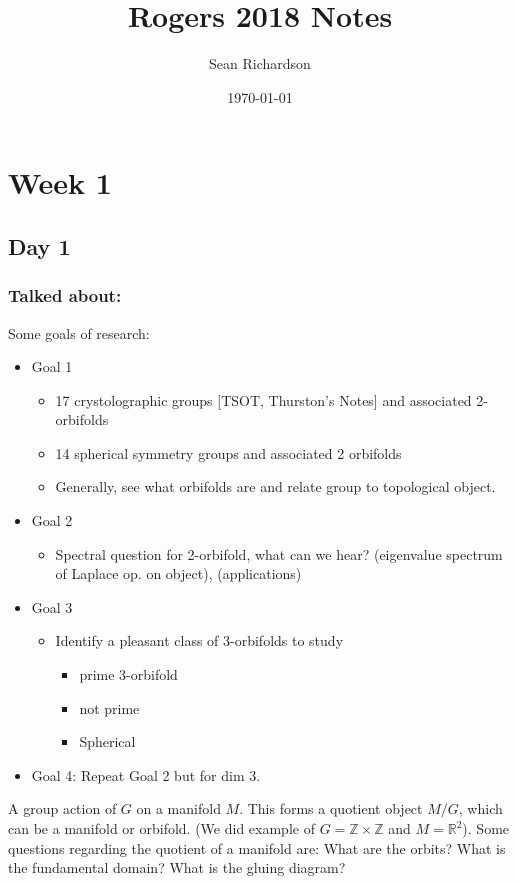 \documentclass[11pt]{article}
\begin{document}
\title{Rogers 2018 Notes}
\author{Sean Richardson}
\date{\today}
\maketitle

\section{Week 1}
\subsection{Day 1}
\subsubsection{Talked about:} 
Some goals of research:
\begin{itemize}
    \item Goal 1
    \begin{itemize}
        \item 17 crystolographic groups [TSOT, Thurston's Notes] and associated 2-orbifolds
        \item 14 spherical symmetry groups and associated 2 orbifolds
        \item Generally, see what orbifolds are and relate group to topological object.
    \end{itemize}
    \item Goal 2
    \begin{itemize}
        \item Spectral question for 2-orbifold, what can we hear? (eigenvalue spectrum of Laplace op. on object), (applications)
    \end{itemize}
    \item Goal 3
    \begin{itemize}
        \item Identify a pleasant class of 3-orbifolds to study
        \begin{itemize}
            \item prime 3-orbifold
            \item not prime
            \item Spherical
        \end{itemize}
    \end{itemize}
    \item Goal 4: Repeat Goal 2 but for dim 3.
\end{itemize}
A group action of $G$ on a manifold $M$. This forms a quotient object $M/G$, which can be a manifold or orbifold. (We did example of $G = \mathbb{Z}\times \mathbb{Z}$ and $M = \mathbb{R}^2$). Some questions regarding the quotient of a manifold are: What are the orbits? What is the fundamental domain? What is the gluing diagram?
\end{document}
